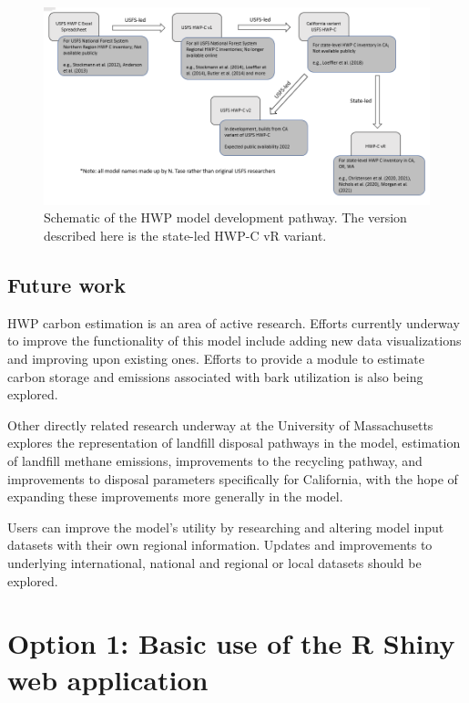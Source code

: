 \documentclass[
  openany]{book}
\begin{document}
\begin{figure}
\includegraphics[width=1\linewidth]{images/ModelHistory} \caption{Schematic of the HWP model development pathway.  The version described here is the state-led HWP-C vR variant.}\label{fig:hist-fig}
\end{figure}

\hypertarget{int-future}{%
\section{Future work}\label{int-future}}

HWP carbon estimation is an area of active research. Efforts currently underway to improve the functionality of this model include adding new data visualizations and improving upon existing ones. Efforts to provide a module to estimate carbon storage and emissions associated with bark utilization is also being explored.

Other directly related research underway at the University of Massachusetts explores the representation of landfill disposal pathways in the model, estimation of landfill methane emissions, improvements to the recycling pathway, and improvements to disposal parameters specifically for California, with the hope of expanding these improvements more generally in the model.

Users can improve the model's utility by researching and altering model input datasets with their own regional information. Updates and improvements to underlying international, national and regional or local datasets should be explored.

\hypertarget{app}{%
\chapter{Option 1: Basic use of the R Shiny web application}\label{app}}
\end{document}
